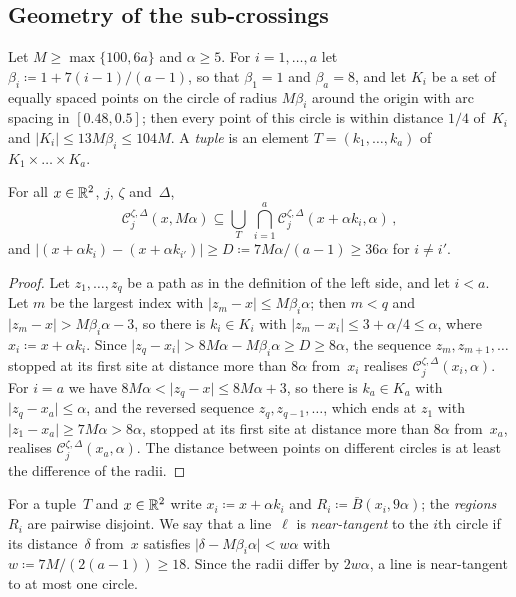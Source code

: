 \documentclass[11pt,letterpaper]{article}
\newcommand{\cC}{\mathcal C}
\begin{document}
\subsection{Geometry of the sub-crossings}
\label{sub:sec:geometry}

Let $M\ge\max\{100,6a\}$ and $\alpha\ge5$. For $i=1,\dots,a$ let $\beta_i\coloneqq1+7(i-1)/(a-1)$, so that $\beta_1=1$ and $\beta_a=8$, and let $K_i$ be a set of equally spaced points on the circle of radius $M\beta_i$ around the origin with arc spacing in $[0.48,0.5]$; then every point of this circle is within distance $1/4$ of~$K_i$ and $\lvert K_i\rvert\le13M\beta_i\le104M$. A \emph{tuple} is an element $T=(k_1,\dots,k_a)$ of $K_1\times\dots\times K_a$.

\begin{lemma}[Inclusion]
\label{sub:lem:inclusion}
For all $x\in\mathbb R^2$, $j$, $\zeta$ and~$\Delta$,
\begin{equation}
\label{sub:eq:inclusion}
  \cC_j^{\zeta,\Delta}(x,M\alpha)\subseteq\bigcup_{T}\ \bigcap_{i=1}^{a}\cC_j^{\zeta,\Delta}(x+\alpha k_i,\alpha)\,,
\end{equation}
and $\lvert(x+\alpha k_i)-(x+\alpha k_{i'})\rvert\ge D\coloneqq7M\alpha/(a-1)\ge36\alpha$ for $i\neq i'$.
\end{lemma}

\begin{proof}
Let $z_1,\dots,z_q$ be a path as in the definition of the left side, and let $i<a$. Let $m$ be the largest index with $\lvert z_m-x\rvert\le M\beta_i\alpha$; then $m<q$ and $\lvert z_m-x\rvert>M\beta_i\alpha-3$, so there is $k_i\in K_i$ with $\lvert z_m-x_i\rvert\le3+\alpha/4\le\alpha$, where $x_i\coloneqq x+\alpha k_i$. Since $\lvert z_q-x_i\rvert>8M\alpha-M\beta_i\alpha\ge D\ge8\alpha$, the sequence $z_m,z_{m+1},\dots$ stopped at its first site at distance more than $8\alpha$ from~$x_i$ realises $\cC_j^{\zeta,\Delta}(x_i,\alpha)$. For $i=a$ we have $8M\alpha<\lvert z_q-x\rvert\le8M\alpha+3$, so there is $k_a\in K_a$ with $\lvert z_q-x_a\rvert\le\alpha$, and the reversed sequence $z_q,z_{q-1},\dots$, which ends at $z_1$ with $\lvert z_1-x_a\rvert\ge7M\alpha>8\alpha$, stopped at its first site at distance more than $8\alpha$ from~$x_a$, realises $\cC_j^{\zeta,\Delta}(x_a,\alpha)$. The distance between points on different circles is at least the difference of the radii.
\end{proof}

For a tuple~$T$ and $x\in\mathbb R^2$ write $x_i\coloneqq x+\alpha k_i$ and $R_i\coloneqq \bar B(x_i,9\alpha)$; the \emph{regions} $R_i$ are pairwise disjoint. We say that a line~$\ell$ is \emph{near-tangent} to the $i$th circle if its distance~$\delta$ from~$x$ satisfies $\lvert\delta-M\beta_i\alpha\rvert<w\alpha$ with $w\coloneqq7M/(2(a-1))\ge18$. Since the radii differ by $2w\alpha$, a line is near-tangent to at most one circle.
\end{document}
